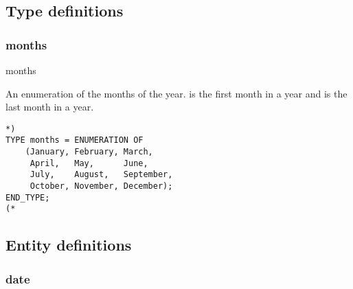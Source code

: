 \documentclass{article}
\begin{document}
\subsection{Type definitions}

\subsubsection{months}

\begin{Mnamedesc}{months}
\begin{Mdesctext}
    An enumeration of the months of the year.  is the first month
in a year and  is the last month in a year.

\end{Mdesctext}

\begin{Mexp}
\begin{verbatim}
*)
TYPE months = ENUMERATION OF
    (January, February, March,
     April,   May,      June,
     July,    August,   September,
     October, November, December);
END_TYPE;
(*
\end{verbatim}
\end{Mexp}
\end{Mnamedesc}

\subsection{Entity definitions}

\subsubsection{date}
\end{document}
